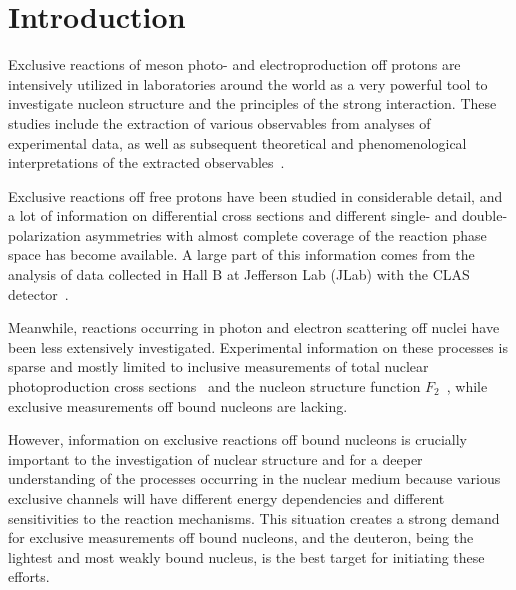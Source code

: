 \documentclass[prc,twocolumn,superscriptaddress,showpacs,amssymb,amsmath,amsfonts,aps,nofootinbib]{revtex4-1}
\begin{document}

\maketitle



\section{Introduction  }
\label{intro}



Exclusive reactions of meson photo- and electroproduction off protons are intensively utilized in laboratories around the world as a very powerful tool to investigate nucleon structure and the principles of the strong interaction. These studies include the extraction of various observables from analyses of experimental data, as well as subsequent theoretical and phenomenological interpretations of the extracted observables~\cite{Krusche:2003ik,Aznauryan:2011qj,Skorodumina:2016pnb}.


Exclusive reactions off free protons have been studied in considerable detail, and a lot of information on differential cross sections and different single- and double-polarization asymmetries with almost complete coverage of the reaction phase space has become available. A large part of this information comes from the analysis of data collected in Hall B at Jefferson Lab (JLab) with the CLAS detector~\cite{Mecking:2003zu,CLAS_DB}.%


Meanwhile, reactions occurring in photon and electron scattering off nuclei have been less extensively investigated. Experimental information on these processes is sparse and mostly limited to inclusive measurements of total nuclear photoproduction cross sections~\cite{Mokeev:1995fy,Bianchi:1994ax,Ahrens:1986hn} and the nucleon structure function $F_{\text{2}}$~\cite{Osipenko_2005_note,Osipenko:2005gt,Osipenko:2010sb}, while exclusive measurements off bound nucleons are lacking.


However, information on exclusive reactions off bound nucleons is crucially important to the investigation of nuclear structure and for a deeper understanding of the processes occurring in the nuclear medium because various exclusive channels will have different energy dependencies and different sensitivities to the reaction mechanisms. This situation creates a strong demand for exclusive measurements off bound nucleons, and the deuteron, being the lightest and most weakly bound nucleus, is the best target for initiating these efforts.
\end{document}
